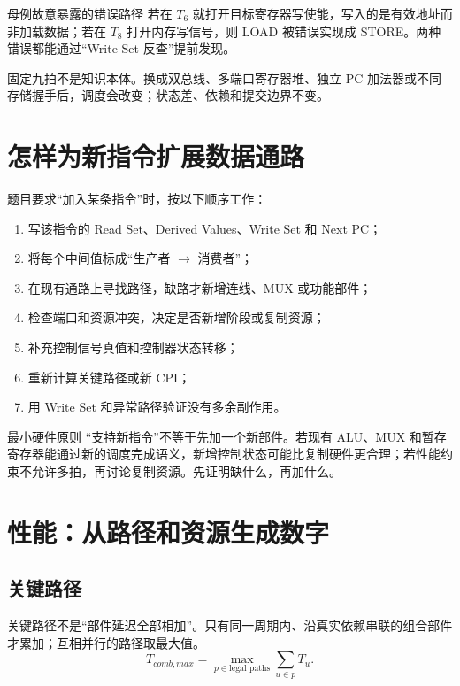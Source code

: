 \documentclass[UTF8,fontset=fandol,11pt,a4paper]{ctexart}
\begin{document}
\begin{warnbox}{母例故意暴露的错误路径}
若在 $T_6$ 就打开目标寄存器写使能，写入的是有效地址而非加载数据；若在 $T_8$ 打开内存写信号，则 LOAD 被错误实现成 STORE。两种错误都能通过“Write Set 反查”提前发现。
\end{warnbox}

固定九拍不是知识本体。换成双总线、多端口寄存器堆、独立 PC 加法器或不同存储握手后，调度会改变；状态差、依赖和提交边界不变。

\section{怎样为新指令扩展数据通路}

题目要求“加入某条指令”时，按以下顺序工作：
\begin{enumerate}
  \item 写该指令的 Read Set、Derived Values、Write Set 和 Next PC；
  \item 将每个中间值标成“生产者 $\to$ 消费者”；
  \item 在现有通路上寻找路径，缺路才新增连线、MUX 或功能部件；
  \item 检查端口和资源冲突，决定是否新增阶段或复制资源；
  \item 补充控制信号真值和控制器状态转移；
  \item 重新计算关键路径或新 CPI；
  \item 用 Write Set 和异常路径验证没有多余副作用。
\end{enumerate}

\begin{methodbox}{最小硬件原则}
“支持新指令”不等于先加一个新部件。若现有 ALU、MUX 和暂存寄存器能通过新的调度完成语义，新增控制状态可能比复制硬件更合理；若性能约束不允许多拍，再讨论复制资源。先证明缺什么，再加什么。
\end{methodbox}

\section{性能：从路径和资源生成数字}

\subsection{关键路径}

关键路径不是“部件延迟全部相加”。只有同一周期内、沿真实依赖串联的组合部件才累加；互相并行的路径取最大值。
\[
T_{comb,max}=\max_{p\in\text{legal paths}}\sum_{u\in p}T_u.
\]
\end{document}
